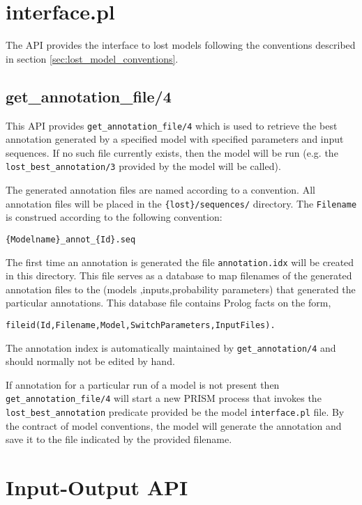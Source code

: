 \documentclass{book}
\begin{document}
\section{interface.pl}

The API provides the interface to lost models following the
conventions described in section \ref{sec:lost_model_conventions}.

\subsection{get\_annotation\_file/4}

This API provides \texttt{get\_annotation\_file/4} which is used to
retrieve the best annotation generated by a specified model with
specified parameters and input sequences. If no such file currently
exists, then the model will be run (e.g. the
\texttt{lost\_best\_annotation/3} provided by the model will be
called).


The generated annotation files are named according to a convention. 
All annotation files will be placed in the \texttt{\{lost\}/sequences/}
directory. 
The \texttt{Filename} is construed according to the following convention:
\begin{verbatim}
{Modelname}_annot_{Id}.seq
\end{verbatim}

The first time an annotation is generated the file
\texttt{annotation.idx} will be created in this directory. This file
serves as a database to map filenames of the generated annotation
files to the (models ,inputs,probability parameters) that generated
the particular annotations. This database file contains Prolog facts 
on the form,
\begin{verbatim}
fileid(Id,Filename,Model,SwitchParameters,InputFiles).
\end{verbatim}

The annotation index is automatically maintained by
\texttt{get\_annotation/4} and should normally not be edited by hand.

If annotation for a particular run of a model is not present then
\texttt{get\_annotation\_file/4} will start a new PRISM process 
that invokes the \texttt{lost\_best\_annotation} predicate provided
be the model \texttt{interface.pl} file. By the contract of model 
conventions, the model will generate the annotation and save it 
to the file indicated by the provided filename.

\section{Input-Output API}
\end{document}
